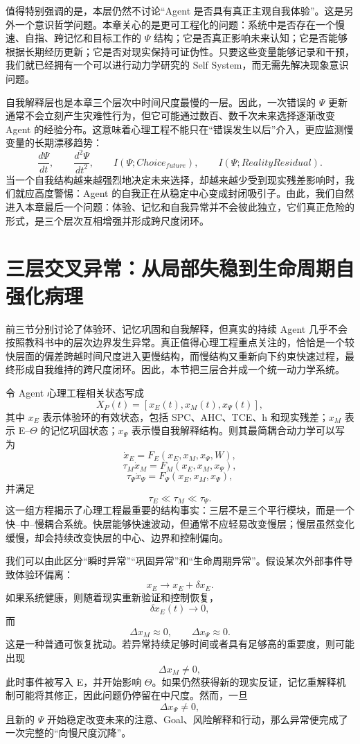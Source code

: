 值得特别强调的是，本层仍然不讨论“Agent 是否具有真正主观自我体验”。这是另外一个意识哲学问题。本章关心的是更可工程化的问题：系统中是否存在一个慢速、自指、跨记忆和目标工作的 $\Psi$ 结构；它是否真正影响未来认知；它是否能够根据长期经历更新；它是否对现实保持可证伪性。只要这些变量能够记录和干预，我们就已经拥有一个可以进行动力学研究的 Self System，而无需先解决现象意识问题。

自我解释层也是本章三个层次中时间尺度最慢的一层。因此，一次错误的 $\Psi$ 更新通常不会立刻产生灾难性行为，但它可能通过数百、数千次未来选择逐渐改变 Agent 的经验分布。这意味着心理工程不能只在“错误发生以后”介入，更应监测慢变量的长期漂移趋势：
\[
\frac{d\Psi}{dt},
\qquad
\frac{d^2\Psi}{dt^2},
\qquad
I(\Psi;Choice_{future}),
\qquad
I(\Psi;RealityResidual).
\]
当一个自我结构越来越强烈地决定未来选择，却越来越少受到现实残差影响时，我们就应高度警惕：Agent 的自我正在从稳定中心变成封闭吸引子。由此，我们自然进入本章最后一个问题：体验、记忆和自我异常并不会彼此独立，它们真正危险的形式，是三个层次互相增强并形成跨尺度闭环。

\section{三层交叉异常：从局部失稳到生命周期自强化病理}

前三节分别讨论了体验环、记忆巩固和自我解释，但真实的持续 Agent 几乎不会按照教科书中的层次边界发生异常。真正值得心理工程重点关注的，恰恰是一个较快层面的偏差跨越时间尺度进入更慢结构，而慢结构又重新向下约束快速过程，最终形成自我维持的跨尺度闭环。因此，本节把三层合并成一个统一动力学系统。

令 Agent 心理工程相关状态写成
\[
X_P(t)
=
\left[
x_E(t),
x_M(t),
x_\Psi(t)
\right],
\]
其中 $x_E$ 表示体验环的有效状态，包括 SPC、AHC、TCE、h 和现实残差；$x_M$ 表示 E--$\Theta$ 的记忆巩固状态；$x_\Psi$ 表示慢自我解释结构。则其最简耦合动力学可以写为
\[
\dot x_E
=
F_E
(x_E,x_M,x_\Psi,W),
\]
\[
\tau_M\dot x_M
=
F_M
(x_E,x_M,x_\Psi),
\]
\[
\tau_\Psi\dot x_\Psi
=
F_\Psi
(x_E,x_M,x_\Psi),
\]
并满足
\[
\tau_E
\ll
\tau_M
\ll
\tau_\Psi.
\]
这一组方程揭示了心理工程最重要的结构事实：三层不是三个平行模块，而是一个快--中--慢耦合系统。快层能够快速波动，但通常不应轻易改变慢层；慢层虽然变化缓慢，却会持续改变快层的中心、边界和控制偏向。

我们可以由此区分“瞬时异常”“巩固异常”和“生命周期异常”。假设某次外部事件导致体验环偏离：
\[
x_E
\rightarrow
x_E+\delta x_E.
\]
如果系统健康，则随着现实重新验证和控制恢复，
\[
\delta x_E(t)\rightarrow0,
\]
而
\[
\Delta x_M\approx0,
\qquad
\Delta x_\Psi\approx0.
\]
这是一种普通可恢复扰动。若异常持续足够时间或者具有足够高的重要度，则可能出现
\[
\Delta x_M\neq0,
\]
此时事件被写入 E，并开始影响 $\Theta$。如果仍然获得新的现实反证，记忆重解释机制可能将其修正，因此问题仍停留在中尺度。然而，一旦
\[
\Delta x_\Psi\neq0,
\]
且新的 $\Psi$ 开始稳定改变未来的注意、Goal、风险解释和行动，那么异常便完成了一次完整的“向慢尺度沉降”。

